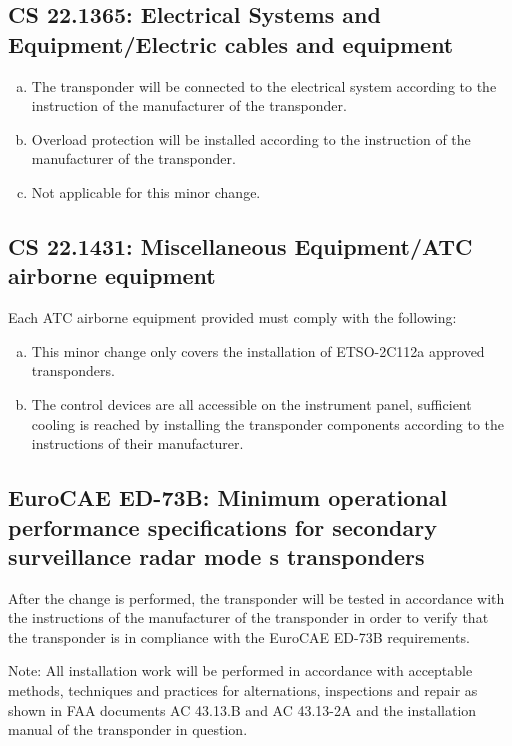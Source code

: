 \documentclass[twoside]{article}
\begin{document}
\subsection[CS 22.1365]{CS 22.1365:  Electrical Systems and Equipment/Electric cables and equipment}
\begin{enumerate}[(a)] 
\item The transponder will be connected to the electrical system according to the instruction of the manufacturer of the transponder.
\item Overload protection will be installed according to the instruction of
the manufacturer of the transponder.
\item Not applicable for this minor change.
\end{enumerate}

\subsection[CS 22.1431]{CS 22.1431:  Miscellaneous Equipment/ATC airborne equipment}
Each ATC airborne equipment provided must comply with the following:
\begin{enumerate}[(a)]
\item This minor change only covers the installation of ETSO-2C112a approved transponders.
\item The control devices are all accessible on the instrument panel, sufficient cooling is reached by installing the transponder components according to the instructions of their manufacturer.
\end{enumerate}


\subsection[EuroCAE ED-73B]{EuroCAE ED-73B: Minimum operational performance specifications for secondary surveillance radar mode s transponders}
After the change is performed, the transponder will be tested in accordance with the instructions of the manufacturer of the transponder in order to verify that the transponder is in compliance with the EuroCAE ED-73B requirements.


Note:
All installation work will be performed in accordance with acceptable methods, techniques and practices for alternations, inspections and repair as shown in FAA documents AC 43.13.B and AC 43.13-2A and the installation manual of the transponder in question.
\end{document}
